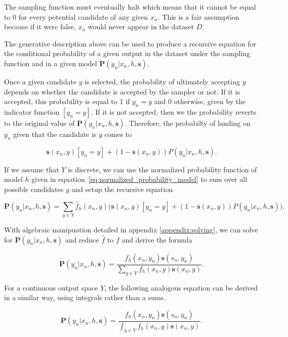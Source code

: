 \documentclass[twoside]{article}
\begin{document}
The sampling function must eventually halt which means that it cannot be equal to 0 for every potential candidate of any given \(x_n\). This is a fair assumption because if it were false, \(x_n\) would never appear in the dataset \(D\).

The generative description above can be used to produce a recursive equation for the conditional probability of a given output in the dataset under the sampling function and in a given model \(\mathbf{P}(y_n|x_n,h,\mathbf{s})\).

Once a given candidate \(y\) is selected, the probability of ultimately accepting \(y\) depends on whether the candidate is accepted by the sampler or not. If it is accepted, this probability is equal to 1 if \(y_n = y\) and 0 otherwise, given by the indicator function \(\left [y_n = y\right ]\). If it is not accepted, then we the probability reverts to the original value of \(\mathbf{P}(y_n|x_n,h,\mathbf{s})\). Therefore, the probabilty of landing on \(y_n\) given that the candidate is \(y\) comes to

\[\mathbf{s}(x_n,y)\left [y_n = y\right ] + (1-\mathbf{s}(x_n,y))P(y_n|x_n,h,\mathbf{s}).\]

If we assume that \(Y\) is discrete, we can use the normalized probability function of model \(h\) given in equation~\eqref{eq:normalized_probability_model} to sum over all possible candidates \(y\) and setup the recursive equation

\begin{equation}
\label{eq:bias_corrected_setup}
\mathbf{P}(y_n|x_n,h,\mathbf{s})=\sum_{y \in Y}\hat{f}_h(x_n,y)\big(\mathbf{s}(x_n,y)\left [y_n = y\right ] + (1-\mathbf{s}(x_n,y))P(y_n|x_n,h,\mathbf{s})\big).
\end{equation}

With algebraic manipuation detailed in appendix \ref{appendix:solving}, we can solve for \(\mathbf{P}(y_n|x_n,h,\mathbf{s})\) and reduce \(\hat{f}\) to \(f\) and derive the formula

\begin{equation}
\label{eq:bias_corrected_prob}
\mathbf{P}(y_n|x_n,h,\mathbf{s})=\frac{f_h(x_n,y_n)\mathbf{s}(s_n,y_n)}{\sum_{y \in Y}f_h(x_n,y)\mathbf{s}(x_n,y)}.
\end{equation}

For a continuous output space \(Y\), the following analogous equation can be derived in a similar way, using integrals rather than a sums.

\begin{equation}
\label{eq:bias_corrected_prob_continuous}
\mathbf{P}(y_n|x_n,h,\mathbf{s})=\frac{f_h(x_n,y_n)\mathbf{s}(s_n,y_n)}{\int_{y \in Y}f_h(x_n,y)\mathbf{s}(x_n,y)}.
\end{equation}
\end{document}
